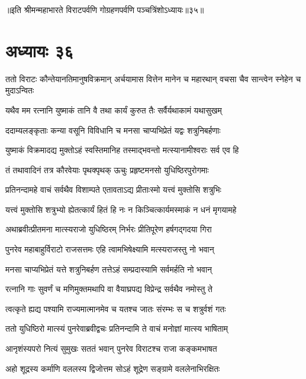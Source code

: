 ॥इति श्रीमन्महाभारते विराटपर्वणि गोग्रहणपर्वणि पञ्चत्रिंशोऽध्यायः॥३५॥

\chapter{अध्यायः ३६}

\threelineshloka
{ततो विराटः कौन्तेयानतिमानुषविक्रमान्}
{अर्चयामास वित्तेन मानेन च महारथान्}
{वचसा चैव सान्त्वेन स्नेहेन च मुदाऽन्वितः}




\twolineshloka
{यथैव मम रत्नानि युष्माकं तानि वै तथा}
{कार्यं कुरुत तैः सर्वैर्यथाकामं यथासुखम्}


\twolineshloka
{ददाम्यलङ्कृताः कन्या वसूनि विविधानि च}
{मनसा चाप्यभिप्रेतं यद्वः शत्रुनिबर्हणाः}


\twolineshloka
{युष्माकं विक्रमादद्य मुक्तोऽहं स्वस्तिमानिह}
{तस्माद्भवन्तो मत्स्यानामीश्वराः सर्व एव हि}



\twolineshloka
{तं तथावादिनं तत्र कौरवेयाः पृथक्पृथक्}
{ऊचुः प्रहृष्टमनसो युधिष्ठिरपुरोगमाः}


\twolineshloka
{प्रतिनन्दामहे वाचं सर्वथैव विशाम्पते}
{एतावताऽद्य प्रीताःस्मो यत्त्वं मुक्तोसि शत्रुभिः}


\twolineshloka
{यत्त्वं मुक्तोसि शत्रुभ्यो ह्येतत्कार्यं हितं हि नः}
{न किञ्चित्कार्यमस्माकं न धनं मृगयामहे}


\twolineshloka
{अथाब्रवीत्प्रीतमना मात्स्यराजो युधिष्ठिरम्}
{निर्भरः प्रीतिपूरेण हर्षगद्गदया गिरा}


\twolineshloka
{पुनरेव महाबाहुर्विराटो राजसत्तमः}
{एहि त्वामभिषेक्ष्यामि मत्स्यराजस्तु नो भवान्}


\twolineshloka
{मनसा चाप्यभिप्रेतं यत्ते शत्रुनिबर्हण}
{तत्तेऽहं सम्प्रदास्यामि सर्वमर्हति नो भवान्}


\twolineshloka
{रत्नानि गाः सुवर्णं च मणिमुक्तमथापि वा}
{वैयाघ्रपद्य विप्रेन्द्र सर्वथैव नमोस्तु ते}


\twolineshloka
{त्वत्कृते ह्यद्य पश्यामि राज्यमात्मानमेव च}
{यतश्च जातः संरम्भः स च शत्रुर्वशं गतः}


\twolineshloka
{ततो युधिष्ठिरो मात्स्यं पुनरेवाब्रवीद्वचः}
{प्रतिनन्दामि ते वाचं मनोज्ञां मात्स्य भाषिताम्}


\twolineshloka
{आनृशंस्यपरो नित्यं सुमुखः सततं भवान्}
{पुनरेव विराटश्च राजा कङ्कमभाषत}


\twolineshloka
{अहो शूद्रस्य कर्माणि वललस्य द्विजोत्तम}
{सोऽहं शूद्रेण सङ्ग्रामे वललेनाभिरक्षितः}



